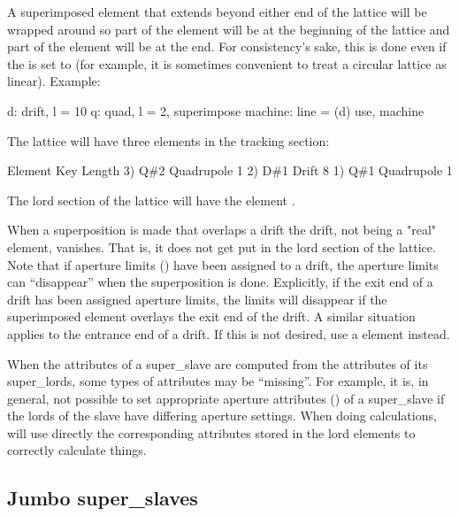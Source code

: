 A superimposed element that extends beyond either end of the lattice
will be wrapped around so part of the element will be at the beginning
of the lattice and part of the element will be at the end. For
consistency's sake, this is done even if the  is set to
 (for example, it is sometimes convenient to treat a circular
lattice as linear). Example:
\begin{example}
  d: drift, l = 10
  q: quad, l = 2, superimpose
  machine: line = (d)
  use, machine
\end{example}
The lattice will have three elements in the tracking section:
\begin{example}
        Element   Key           Length
  3)    Q{\#}2       Quadrupole    1
  2)    D{\#}1       Drift         8
  1)    Q{\#}1       Quadrupole    1
\end{example}
The lord section of the lattice will have the element . 

When a superposition is made that overlaps a drift the drift, not
being a "real" element, vanishes. That is, it does not get put in the
lord section of the lattice.  Note that if aperture limits
() have been assigned to a drift, the aperture limits
can ``disappear'' when the superposition is done. Explicitly, if the
exit end of a drift has been assigned aperture limits, the limits will
disappear if the superimposed element overlays the exit end of the
drift. A similar situation applies to the entrance end of a drift. If
this is not desired, use a  element instead.

When the attributes of a super_slave are computed from the attributes
of its super_lords, some types of attributes may be ``missing''. For
example, it is, in general, not possible to set appropriate aperture
attributes () of a super_slave if the lords of the slave
have differing aperture settings. When doing calculations, \bmad will
use directly the corresponding attributes stored in the lord elements to
correctly calculate things.

\subsection{Jumbo super_slaves}
\label{s:jumbo.slave}

